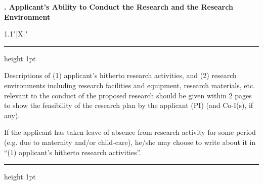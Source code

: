 \documentclass[8pt]{extarticle}
\makeatletter
\newcommand{\thickhline}{%
	\noalign {\ifnum 0=`}\fi \hrule height 1pt
	\futurelet \reserved@a \@xhline
}
\makeatother
\begin{document}
	
\noindent\textbf{\fontsize{12}{12}. Applicant's Ability to Conduct the Research and the Research Environment}\\
\begin{tabularx}{1.1\linewidth}{"|X|"}
	\thickhline
	Descriptions of (1) applicant's hitherto research activities, and (2) research environments including research facilities and equipment, research materials, etc. relevant to the conduct of the proposed research should be given within 2 pages to show the feasibility of the research plan by the applicant (PI) (and Co-I(s), if any).
	
	If the applicant has taken leave of absence from research activity for some period (e.g. due to maternity and/or child-care), he/she may choose to write about it in ``(1) applicant's hitherto research activities''.
	\\
	\thickhline
\end{tabularx}
\end{document}
